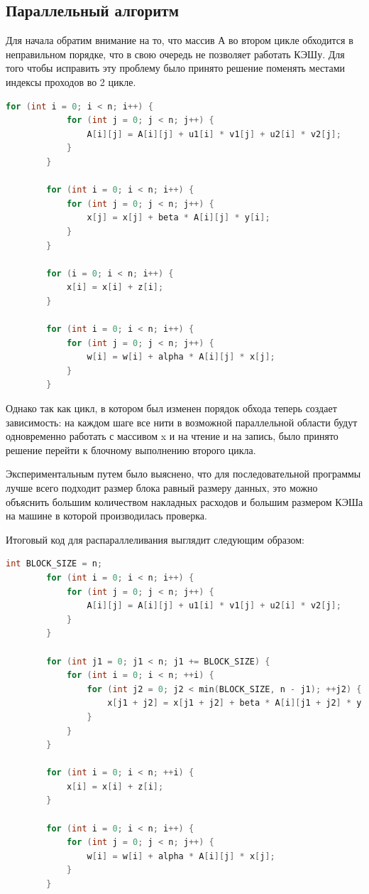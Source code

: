 \documentclass{article}
\begin{document}
\subsection {Параллельный алгоритм}

Для начала обратим внимание на то, что массив А во втором цикле
обходится в неправильном порядке, что в свою очередь не позволяет работать КЭШу. Для того чтобы исправить эту проблему было принято решение поменять местами индексы проходов во 2 цикле. 

\begin{lstlisting}[language = C]
        for (int i = 0; i < n; i++) {
            for (int j = 0; j < n; j++) {
                A[i][j] = A[i][j] + u1[i] * v1[j] + u2[i] * v2[j];
            }
        }

        for (int i = 0; i < n; i++) {
            for (int j = 0; j < n; j++) {
                x[j] = x[j] + beta * A[i][j] * y[i];
            }
        }

        for (i = 0; i < n; i++) {
            x[i] = x[i] + z[i];
        }

        for (int i = 0; i < n; i++) {
            for (int j = 0; j < n; j++) {
                w[i] = w[i] + alpha * A[i][j] * x[j];
            }
        }
\end{lstlisting}
\vspace{0.5cm}

Однако так как цикл, в котором был изменен порядок обхода теперь создает зависимость: на каждом шаге все нити в возможной параллельной области будут одновременно работать с массивом x и на чтение и на запись, было принято решение перейти к блочному выполнению второго цикла.

Экспериментальным путем было выяснено, что для последовательной
программы лучше всего подходит размер блока равный размеру данных, это можно
объяснить большим количеством накладных расходов и большим размером КЭШа на
машине в которой производилась проверка.

\vspace{0.5cm}
Итоговый код для распараллеливания выглядит следующим образом:

\begin{lstlisting}[language = C]
        int BLOCK_SIZE = n;
        for (int i = 0; i < n; i++) {
            for (int j = 0; j < n; j++) {
                A[i][j] = A[i][j] + u1[i] * v1[j] + u2[i] * v2[j];
            }
        }

        for (int j1 = 0; j1 < n; j1 += BLOCK_SIZE) {
            for (int i = 0; i < n; ++i) {
                for (int j2 = 0; j2 < min(BLOCK_SIZE, n - j1); ++j2) {
                    x[j1 + j2] = x[j1 + j2] + beta * A[i][j1 + j2] * y[i];
                }
            }
        }

        for (int i = 0; i < n; ++i) {
            x[i] = x[i] + z[i];
        }

        for (int i = 0; i < n; i++) {
            for (int j = 0; j < n; j++) {
                w[i] = w[i] + alpha * A[i][j] * x[j];
            }
        }
\end{lstlisting}
\end{document}
